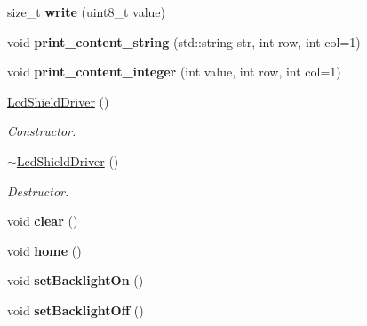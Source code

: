 \begin{DoxyCompactItemize}
\item 
\mbox{\label{classLcdShieldDriver_aea03f93f7dfad9bc185bd77ef059c665}} 
size\+\_\+t {\bfseries write} (uint8\+\_\+t value)
\item 
\mbox{\label{classLcdShieldDriver_a893f217db662b34726d0684bb014f7d4}} 
void {\bfseries print\+\_\+content\+\_\+string} (std\+::string str, int row, int col=1)
\item 
\mbox{\label{classLcdShieldDriver_ae1a249341c06d6992767e8176ef96056}} 
void {\bfseries print\+\_\+content\+\_\+integer} (int value, int row, int col=1)
\item 
\mbox{\label{classLcdShieldDriver_a14d2027ac041be273d6b894a6d66bb1f}} 
\hyperlink{classLcdShieldDriver_a14d2027ac041be273d6b894a6d66bb1f}{Lcd\+Shield\+Driver} ()
\begin{DoxyCompactList}\small\item\em Constructor. \end{DoxyCompactList}\item 
\mbox{\label{classLcdShieldDriver_aaec080d1c36326c1e58642a7e28d85b1}} 
\hyperlink{classLcdShieldDriver_aaec080d1c36326c1e58642a7e28d85b1}{$\sim$\+Lcd\+Shield\+Driver} ()
\begin{DoxyCompactList}\small\item\em Destructor. \end{DoxyCompactList}\item 
\mbox{\label{classLcdShieldDriver_a43e151fc827a4d8d982bc2857b78262e}} 
void {\bfseries clear} ()
\item 
\mbox{\label{classLcdShieldDriver_a7bccc296eef476eb49984bdf8fdebb14}} 
void {\bfseries home} ()
\item 
\mbox{\label{classLcdShieldDriver_a68a86a7407fd3df5714f3351d657e499}} 
void {\bfseries set\+Backlight\+On} ()
\item 
\mbox{\label{classLcdShieldDriver_a81639e7553501343137be8984d7ea7d9}} 
void {\bfseries set\+Backlight\+Off} ()
\item 

\end{DoxyCompactItemize}
